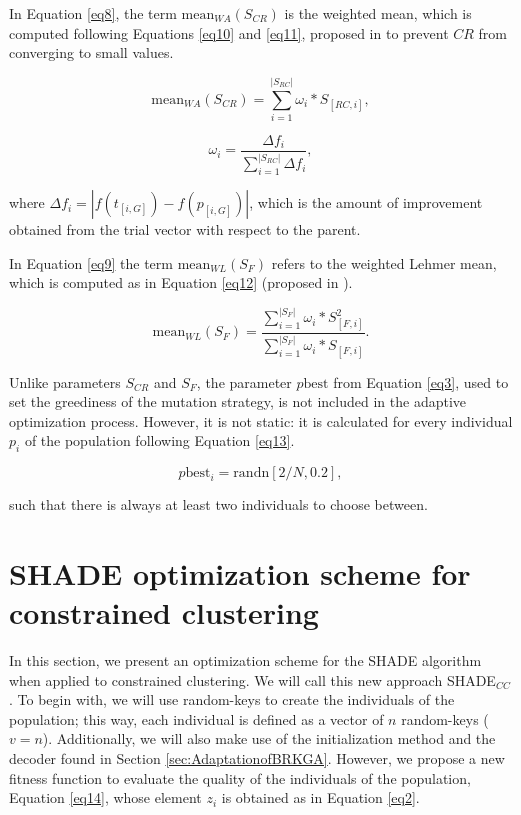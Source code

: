 In Equation \ref{eq8}, the term $\text{mean}_{WA} (S_{CR})$ is the weighted mean, which is computed following Equations \eqref{eq10} and \eqref{eq11}, proposed in \cite{peng2009multi} to prevent $CR$ from converging to small values.

\begin{equation}
\text{mean}_{WA} (S_{CR}) = \sum_{i = 1}^{|S_{RC}|} \omega_i * S_{[RC,i]},
\label{eq10}
\end{equation}

\begin{equation}
\omega_i = \frac{\Delta f_i}{\sum_{i = 1}^{|S_{RC}|} \Delta f_i},
\label{eq11}
\end{equation}

\noindent where $\Delta f_i = |f(t_{[i,G]}) - f(p_{[i, G]})|$, which is the amount of improvement obtained from the trial vector with respect to the parent.

In Equation \ref{eq9} the term $\text{mean}_{WL} (S_{F})$ refers to the weighted Lehmer mean, which is computed as in Equation \eqref{eq12} (proposed in \cite{tanabe2013success}).

\begin{equation}
\text{mean}_{WL} (S_{F}) = \frac{\sum_{i = 1}^{|S_{F}|} \omega_i * S^2_{[F,i]}}{\sum_{i = 1}^{|S_{F}|} \omega_i * S_{[F,i]}}.
\label{eq12}
\end{equation}

Unlike parameters $S_{CR}$ and $S_F$, the parameter $p\text{best}$ from Equation \eqref{eq3}, used to set the greediness of the mutation strategy, is not included in the adaptive optimization process. However, it is not static: it is calculated for every individual $p_i$ of the population following Equation \eqref{eq13}.

\begin{equation}
p\text{best}_i = \text{randn}[2/N, 0.2],
\label{eq13}
\end{equation}

\noindent such that there is always at least two individuals to choose between.

\section{SHADE optimization scheme for constrained clustering} \label{sec:SHADEadapt}

In this section, we present an optimization scheme for the \acs{SHADE} algorithm when applied to constrained clustering. We will call this new approach \acs{SHADE}$_{CC}$. To begin with, we will use random-keys to create the individuals of the population; this way, each individual is defined as a vector of $n$ random-keys ($v = n$). Additionally, we will also make use of the initialization method and the decoder found in Section \ref{sec:AdaptationofBRKGA}. However, we propose a new fitness function to evaluate the quality of the individuals of the population, Equation \eqref{eq14}, whose element $z_i$ is obtained as in Equation \eqref{eq2}.

